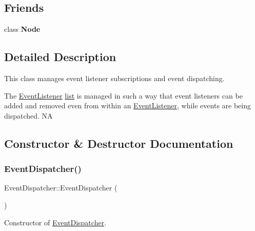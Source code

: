 \subsection*{Friends}
\begin{DoxyCompactItemize}
\item 
\mbox{\label{classEventDispatcher_aed91756449328e2c454e53e9c5e53936}} 
class {\bfseries Node}
\end{DoxyCompactItemize}


\subsection{Detailed Description}
This class manages event listener subscriptions and event dispatching. 

The \hyperlink{classEventListener}{Event\+Listener} \hyperlink{protocollist-p}{list} is managed in such a way that event listeners can be added and removed even from within an \hyperlink{classEventListener}{Event\+Listener}, while events are being dispatched.  NA 

\subsection{Constructor \& Destructor Documentation}
\mbox{\label{classEventDispatcher_aec174a9e25796e5727e59f5452817cda}} 
\subsubsection{\texorpdfstring{Event\+Dispatcher()}{EventDispatcher()}\hspace{0.1cm}{\footnotesize\ttfamily [1/2]}}
{\footnotesize\ttfamily Event\+Dispatcher\+::\+Event\+Dispatcher (\begin{DoxyParamCaption}{ }\end{DoxyParamCaption})}

Constructor of \hyperlink{classEventDispatcher}{Event\+Dispatcher}. \mbox{\label{classEventDispatcher_abb5f401014e87f03027d6c4450964e55}} 
